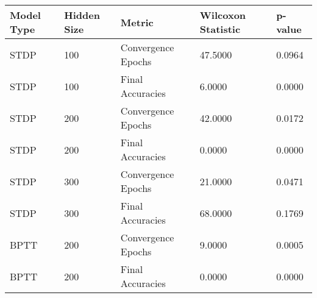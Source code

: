 \begin{tabular}{lllll}
\toprule
Model Type & Hidden Size & Metric & Wilcoxon Statistic & p-value \\
\midrule
STDP & 100 & Convergence Epochs & 47.5000 & 0.0964 \\
STDP & 100 & Final Accuracies & 6.0000 & 0.0000 \\
STDP & 200 & Convergence Epochs & 42.0000 & 0.0172 \\
STDP & 200 & Final Accuracies & 0.0000 & 0.0000 \\
STDP & 300 & Convergence Epochs & 21.0000 & 0.0471 \\
STDP & 300 & Final Accuracies & 68.0000 & 0.1769 \\
BPTT & 200 & Convergence Epochs & 9.0000 & 0.0005 \\
BPTT & 200 & Final Accuracies & 0.0000 & 0.0000 \\
\bottomrule
\end{tabular}
